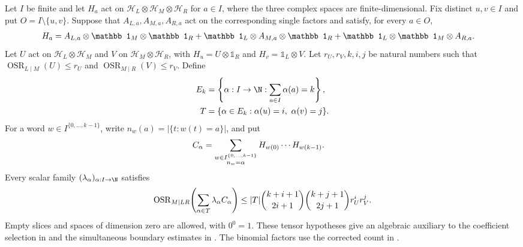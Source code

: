 \begin{theorem}
    \label{thm:weighted_full_frequency_middle_rank}
    \leanok
    Let $I$ be finite and let $H_a$ act on
    $\mathcal H_L\otimes\mathcal H_M\otimes\mathcal H_R$ for $a\in I$,
    where the three complex spaces are finite-dimensional.
    Fix distinct $u,v\in I$ and put $O=I\setminus\{u,v\}$.
    Suppose that $A_{L,a},A_{M,a},A_{R,a}$ act on the corresponding
    single factors and satisfy, for every $a\in O$,
    \begin{align}
        H_a & =A_{L,a}\otimes\mathbb 1_M\otimes\mathbb 1_R
        +\mathbb 1_L\otimes A_{M,a}\otimes\mathbb 1_R
        +\mathbb 1_L\otimes\mathbb 1_M\otimes A_{R,a}.\notag
    \end{align}
    Let $U$ act on $\mathcal H_L\otimes\mathcal H_M$ and $V$ on
    $\mathcal H_M\otimes\mathcal H_R$, with
    $H_u=U\otimes\mathbb 1_R$ and $H_v=\mathbb 1_L\otimes V$.
    Let $r_U,r_V,k,i,j$ be natural numbers such that
    $\operatorname{OSR}_{L\mid M}(U)\le r_U$ and
    $\operatorname{OSR}_{M\mid R}(V)\le r_V$.
    Define
    \begin{align}
        E_k & =\left\{\alpha:I\to\N:\sum_{a\in I}\alpha(a)=k\right\}, \notag \\
        T   & =\{\alpha\in E_k:\alpha(u)=i,\ \alpha(v)=j\}.\notag
    \end{align}
    For a word $w\in I^{\{0,\ldots,k-1\}}$, write
    $n_w(a)=|\{t:w(t)=a\}|$, and put
    \begin{align}
        C_\alpha & =\sum_{\substack{w\in I^{\{0,\ldots,k-1\}}\\n_w=\alpha}}
        H_{w(0)}\cdots H_{w(k-1)}.\notag
    \end{align}
    Every scalar family $(\lambda_\alpha)_{\alpha:I\to\N}$ satisfies
    \begin{align}
        \operatorname{OSR}_{M\mid LR}\!\left(
        \sum_{\alpha\in T}\lambda_\alpha C_\alpha\right)
        \le |T|\binom{k+i+1}{2i+1}\binom{k+j+1}{2j+1}r_U^i r_V^j.\notag
    \end{align}
    Empty slices and spaces of dimension zero are allowed, with $0^0=1$.
    These tensor hypotheses give an algebraic auxiliary to the coefficient
    selection in \cite[Lemma~4.2]{Arad2013AreaLaw} and the simultaneous
    boundary estimates in \cite[proof of Proposition~5.7]{Arad2016RigorousRG}.
    The binomial factors use the corrected count in
    \cite{gap:aklv13_interpolation_and_word_count}.
\end{theorem}
